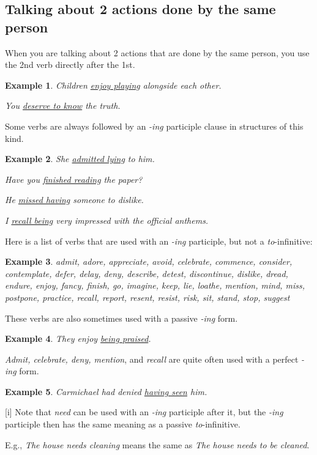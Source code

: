 \documentclass[oneside]{book}
\numberwithin{equation}{section}
\newtheorem{example}{Example}[section]
\begin{document}
\subsection{Talking about 2 actions done by the same person}
\noindent{} When you are talking about 2 actions that are done by the same person, you use the 2nd verb directly after the 1st.
\begin{example}
    Children \underline{enjoy playing} alongside each other.
    
    You \underline{deserve to know} the truth.
\end{example}
%
\noindent{} Some verbs are always followed by an \textit{-ing} participle clause in structures of this kind.
\begin{example}
    She \underline{admitted lying} to him.
    
    Have you \underline{finished reading} the paper?
    
    He \underline{missed having} someone to dislike.
    
    I \underline{recall being} very impressed with the official anthems.
\end{example}
Here is a list of verbs that are used with an \textit{-ing} participle, but not a \textit{to}-infinitive:
\begin{example}
    admit, adore, appreciate, avoid, celebrate, commence, consider, contemplate, defer, delay, deny, describe, detest, discontinue, dislike, dread, endure, enjoy, fancy, finish, go, imagine, keep, lie, loathe, mention, mind, miss, postpone, practice, recall, report, resent, resist, risk, sit, stand, stop, suggest
\end{example}
These verbs are also sometimes used with a passive \textit{-ing} form.
\begin{example}
    They enjoy \underline{being praised}.
\end{example}
\textit{Admit, celebrate, deny, mention}, and \textit{recall} are quite often used with a perfect \textit{-ing} form.
\begin{example}
    Carmichael had denied \underline{having seen} him.
\end{example}
%
\noindent{} [i] Note that \textit{need} can be used with an \textit{-ing} participle after it, but the \textit{-ing} participle then has the same meaning as a passive \textit{to}-infinitive.

E.g., \textit{The house needs cleaning} means the same as \textit{The house needs to be cleaned}.
\end{document}
